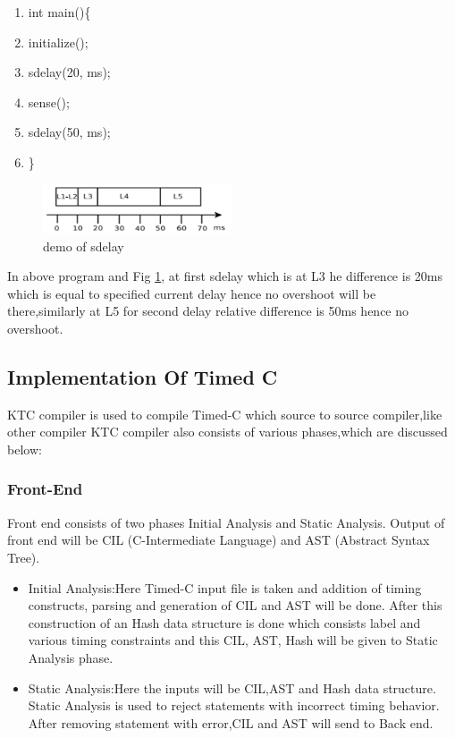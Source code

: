 \documentclass[conference]{IEEEtran}
\begin{document}
\begin{enumerate}
	\item int main()\{
	\item initialize();
	 \item sdelay(20, ms);
	 \item sense();
	 \item  sdelay(50, ms);
	 \item \}
\end{enumerate}

\begin{figure}[!htbp]
	\centering
	\includegraphics[width=0.5\textwidth]{graphics/sdelay}
	\caption{demo of sdelay\cite{8430085}} \label{fig:sdelay}
\end{figure}
In above program and Fig \ref{fig:sdelay}, at first sdelay which is at L3 he difference is 20ms which is equal to specified current delay hence no overshoot will be there,similarly at L5 for second delay relative difference is 50ms hence no overshoot.

\subsection{Implementation Of Timed C}
KTC compiler is used to compile Timed-C which source to source compiler,like other compiler KTC compiler also consists of various phases,which are discussed below:
\subsubsection{Front-End}
Front end consists of two phases Initial Analysis and Static Analysis. Output of front end will be CIL (C-Intermediate Language) and AST (Abstract Syntax Tree).
\begin{itemize}
	\item Initial Analysis:Here Timed-C input file is taken and addition of timing constructs, parsing and generation of CIL and AST will be done. After this construction of an Hash data structure is done which consists label and various timing constraints and this CIL, AST, Hash will be given to Static Analysis phase.
\end{itemize}
\begin{itemize}
	\item Static Analysis:Here the inputs will be CIL,AST and Hash data structure. Static Analysis is used to reject statements with incorrect timing behavior.
	After removing statement with error,CIL and AST will send to Back end.
\end{itemize}
\end{document}
